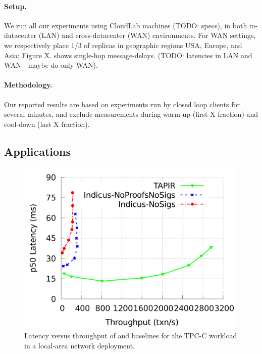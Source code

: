 \paragraph{Setup.} We run all our experiments using CloudLab machines (TODO: specs), in both in-datacenter (LAN) and cross-datacenter (WAN) environments. For WAN settings, we respectively place 1/3 of replicas in geographic regions USA, Europe, and Asia; Figure X. shows single-hop message-delays. (TODO: latencies in LAN and WAN - maybe do only WAN).

\paragraph{Methodology.} Our reported results are based on experiments run by closed loop clients for several minutes, and exclude measurements during warm-up (first X fraction) and cool-down (last X fraction).

\subsection{Applications}

\begin{figure}
  \includegraphics[width=\columnwidth]{figures/eval/tpcc-lat-tput.pdf}
  \caption{Latency versus throughput of \sys{} and baselines for the TPC-C
  workload in a local-area network deployment.}
  \label{fig:tpcc-tput-lat}
\end{figure}


